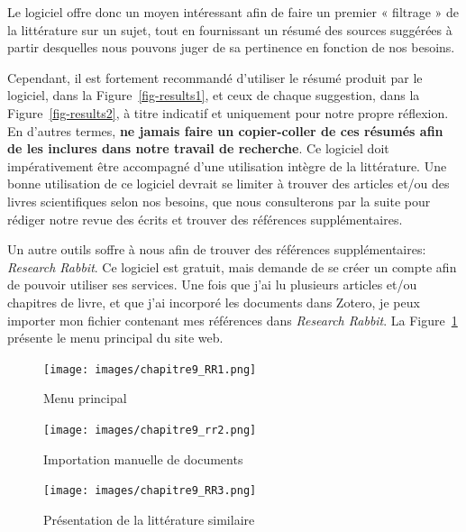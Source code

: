 \documentclass[
  letterpaper,
  DIV=11,
  numbers=noendperiod]{scrreprt}
\begin{document}
Le logiciel offre donc un moyen intéressant afin de faire un premier «
filtrage » de la littérature sur un sujet, tout en fournissant un résumé
des sources suggérées à partir desquelles nous pouvons juger de sa
pertinence en fonction de nos besoins.

Cependant, il est fortement recommandé d'utiliser le résumé produit par
le logiciel, dans la Figure~\ref{fig-results1}, et ceux de chaque
suggestion, dans la Figure~\ref{fig-results2}, à titre indicatif et
uniquement pour notre propre réflexion. En d'autres termes, \textbf{ne
jamais faire un copier-coller de ces résumés afin de les inclures dans
notre travail de recherche}. Ce logiciel doit impérativement être
accompagné d'une utilisation intègre de la littérature. Une bonne
utilisation de ce logiciel devrait se limiter à trouver des articles
et/ou des livres scientifiques selon nos besoins, que nous consulterons
par la suite pour rédiger notre revue des écrits et trouver des
références supplémentaires.

Un autre outils soffre à nous afin de trouver des références
supplémentaires: \emph{Research Rabbit}. Ce logiciel est gratuit, mais
demande de se créer un compte afin de pouvoir utiliser ses services. Une
fois que j'ai lu plusieurs articles et/ou chapitres de livre, et que
j'ai incorporé les documents dans Zotero, je peux importer mon fichier
contenant mes références dans \emph{Research Rabbit}. La
Figure~\ref{fig-rr1} présente le menu principal du site web.

\begin{figure}

{\centering \texttt{[image: images/chapitre9\_RR1.png]}

}

\caption{\label{fig-rr1}Menu principal}

\end{figure}

\begin{figure}

{\centering \texttt{[image: images/chapitre9\_rr2.png]}

}

\caption{\label{fig-rr2}Importation manuelle de documents}

\end{figure}

\begin{figure}

{\centering \texttt{[image: images/chapitre9\_RR3.png]}

}

\caption{\label{fig-rr3}Présentation de la littérature similaire}

\end{figure}
\end{document}
